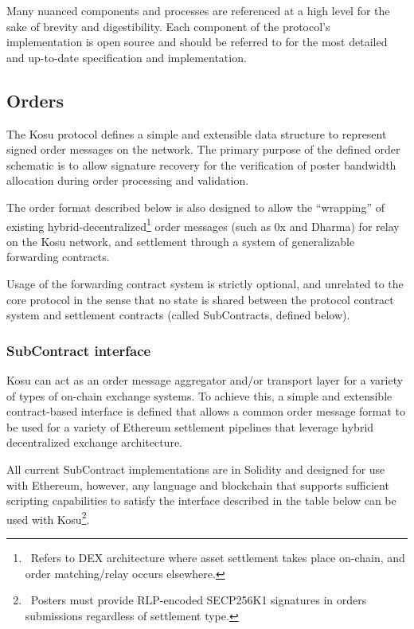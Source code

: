 \documentclass[10pt]{article}
\begin{document}
Many nuanced components and processes are referenced at a high level for the sake of brevity and digestibility. Each component of the protocol’s implementation is open source and should be referred to for the most detailed and up-to-date specification and implementation\cite{paradigm-github}.
\subsection{Orders}\label{orders}

The Kosu protocol defines a simple and extensible data structure to represent signed order messages on the network. The primary purpose of the defined order schematic is to allow signature recovery for the verification of poster bandwidth allocation during order processing and validation.
\medskip

The order format described below is also designed to allow the ``wrapping'' of existing hybrid-decentralized\footnote{\ Refers to DEX architecture where asset settlement takes place on-chain, and order matching/relay occurs elsewhere.} order messages (such as 0x and Dharma\cite{0x-wp, dharma-wp}) for relay on the Kosu network, and settlement through a system of generalizable forwarding contracts.
\medskip

Usage of the forwarding contract system is strictly optional, and unrelated to the core protocol in the sense that no state is shared between the protocol contract system and settlement contracts (called SubContracts, defined below).

\subsubsection{SubContract interface}\label{subcontract-interface}

Kosu can act as an order message aggregator and/or transport layer for a variety of types of on-chain exchange systems. To achieve this, a simple and extensible contract-based interface is defined that allows a common order message format to be used for a variety of Ethereum settlement pipelines that leverage hybrid decentralized exchange architecture.
\medskip

All current SubContract implementations are in Solidity and designed for use with Ethereum, however, any language and blockchain that supports sufficient scripting capabilities to satisfy the interface described in the table below can be used with Kosu\footnote{\ Posters must provide RLP-encoded SECP256K1 signatures in orders submissions regardless of settlement type.}.
\medskip
\end{document}
